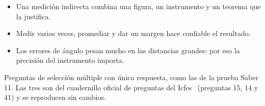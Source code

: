 \documentclass[11pt]{article}
\begin{document}
\begin{resumen}
\begin{itemize}
  \item Una medición indirecta combina una figura, un instrumento y un teorema que la justifica.
  \item Medir varias veces, promediar y dar un margen hace confiable el resultado.
  \item Los errores de ángulo pesan mucho en las distancias grandes: por eso la precisión del instrumento importa.
\end{itemize}
\end{resumen}


\begin{instrucciones}
Preguntas de selección múltiple con única respuesta, como las de la prueba Saber 11.
Las tres son del cuadernillo oficial de preguntas del Icfes~\cite{icfes2026}
(preguntas 15, 14 y 41) y se reproducen sin cambios.
\end{instrucciones}
\end{document}
